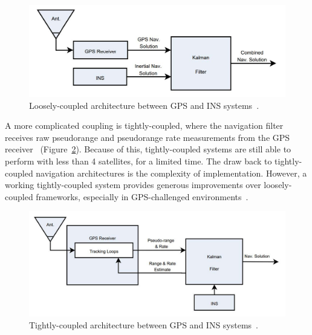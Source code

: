 \begin{figure}[!ht]
    \centering
    \includegraphics[width=\linewidth]{Figures/LC.jpg}
    \caption{Loosely-coupled architecture between GPS and INS systems~\cite{hammAnalysisSimulatedPerformance2005}.}\label{fig:LC}
\end{figure}

A more complicated coupling is {tightly-coupled}, where the navigation filter receives raw pseudorange and pseudorange rate measurements from the GPS receiver~\cite{kaplanUnderstandingGPSPrinciples2006} (Figure~\ref{fig:TC}). Because of this, tightly-coupled systems are still able to perform with less than 4 satellites, for a limited time. The draw back to tightly-coupled navigation architectures is the complexity of implementation. However, a working tightly-coupled system provides generous improvements over loosely-coupled frameworks, especially in GPS-challenged environments~\cite{grierPositionNavigationTiming}.

\begin{figure}[!ht]
    \centering
    \includegraphics[width=\linewidth]{Figures/TC.jpg}
    \caption{Tightly-coupled architecture between GPS and INS systems~\cite{hammAnalysisSimulatedPerformance2005}.}\label{fig:TC}
\end{figure}

